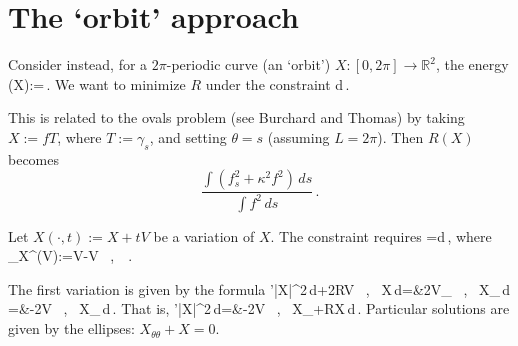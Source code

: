 \documentclass[12pt,reqno]{amsart}
\newcommand{\R}{\ensuremath{\mathbb{R}}}
\newcommand{\inner}[2]{\left\langle #1 \, , \, #2\right\rangle} %
\newcommand{\lb}{\left(}
\newcommand{\rb}{\right)}
\def\bann #1\eann {\begin{align*} #1\end{align*}}
\theoremstyle{plain}
\numberwithin{equation}{section}
\theoremstyle{remark}
\begin{document}
\begin{comment}
Putting everything together, we obtain
\bann
R''={}&2\int \lb\phi-\frac{f_s}{\kappa}F_s\rb(\mathcal{L}f)_t\,ds+\int F\lb A+A_{\theta\theta}-2\frac{R}{L^3}\int f^2\,ds\rb_t\,d\theta\\
={}&2\int \phi (\mathcal{L}f)_t\,ds-2\int f_\theta F_\theta (\mathcal{L}f)_t\,d\theta\\
+{}&\int F\lb A+A_{\theta\theta}-2\frac{R}{L^3}\int f^2\,ds\rb_t\,d\theta\\
={}&2\int \phi\lb \mathcal{L}\phi-f_s(F\kappa)_s+2\kappa F_{ss}-2\lambda f\lb \int F\,d\theta-\kappa F\rb\rb\,ds\\
{}&-2\int f_\theta F_\theta \lb \mathcal{L}\phi-f_s(F\kappa)_s+2\kappa(\kappa F_\theta)_\theta-2\lambda f\lb \int F\,d\theta-\kappa F\rb\rb\,d\theta\\
+{}&\int F\lb A_t+A_{\theta\theta t}\rb\,d\theta-2\int F\lb 3\lambda\int F\,d\theta+\lambda\int (2f\phi-\kappa F f^2)\,ds\rb\,d\theta
\eann
\end{comment}

\section{The `orbit' approach}

Consider instead, for a $2\pi$-periodic curve (an `orbit') $X:[0,2\pi]\to\R^2$, the energy
\bann
R(X):=\,.
\eann
We want to minimize $R$ under the constraint
\bann
\int{}d\,.
\eann

This is related to the ovals problem (see Burchard and Thomas) by taking $X:=fT$, where $T:=\gamma_s$, and setting $\theta=s$ (assuming $L=2\pi$). Then $R(X)$ becomes
\[
\frac{\int (f_s^2+\kappa^2f^2)\,ds}{\int f^2\,ds}\,.
\]

Let $X(\cdot,t):=X+tV$ be a variation of $X$. The constraint requires
\bann
0=\int{}d\theta\,,
\eann
where
\bann
\mathrm{proj}_{X^{\perp}}(V):=V-\inner{V}{}\,.
\eann

The first variation is given by the formula
\bann
R'\int |X|^2\,d\theta+2R\int \inner{V}{X}\,d\theta={}&2\int \inner{V_{\theta}}{X_{\theta}}\,d\theta\\
={}&-2\int \inner{V}{X_{\theta\theta}}\,d\theta\,.
\eann
That is,
\bann
R'\int |X|^2\,d\theta={}&-2\int \inner{V}{X_{\theta\theta}+RX}\,d\theta\,.
\eann
Particular solutions are given by the ellipses: $X_{\theta\theta}+X=0$.
\end{document}
